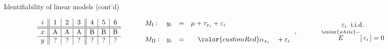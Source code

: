 \begin{frame}{\LARGE Identifiability of linear models (cont'd)}

\pause
{\tiny
\begin{equation*}
\begin{array}{c||c|c|c||c|c|c}
i & 1 & 2 & 3 & 4 & 5 & 6 \\
\hline\hline
x & \textnormal{A} & \textnormal{A} & \textnormal{A} &
      \textnormal{B} & \textnormal{B} & \textnormal{B}
\\
\hline
y & ? & ? & ? & ? & ? & ?
\end{array}
\quad
\quad
\quad
\begin{array}{lccl}
	M_{\textnormal{I}}: & y_{i} &=& \mu + \tau_{x_{i}} + \varepsilon_{i}
	\\ \\
	M_{\textnormal{II}}: & y_{i} &=& \mbox{}\quad{\color{customRed}\alpha_{x_{i}}}\quad\mbox{} + \varepsilon_{i}
\end{array}\,,
\quad
\quad
\quad
\begin{array}{c}
	\varepsilon_{i} \;\; \textnormal{i.i.d.}
	\\
	\overset{{\color{white}-}}{E}\!\left[\,\varepsilon_{i}\,\right] = 0
\end{array}
\end{equation*}
}

\vskip -0.5cm


\end{frame}
